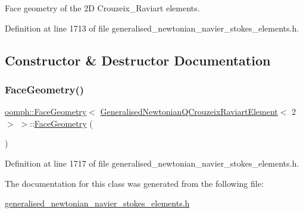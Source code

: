 Face geometry of the 2D Crouzeix\+\_\+\+Raviart elements. 

Definition at line 1713 of file generalised\+\_\+newtonian\+\_\+navier\+\_\+stokes\+\_\+elements.\+h.



\subsection{Constructor \& Destructor Documentation}
\mbox{\label{classoomph_1_1FaceGeometry_3_01GeneralisedNewtonianQCrouzeixRaviartElement_3_012_01_4_01_4_a616ab73e750e2b6c9ee435bfa85840bb}} 
\subsubsection{\texorpdfstring{Face\+Geometry()}{FaceGeometry()}}
{\footnotesize\ttfamily \hyperlink{classoomph_1_1FaceGeometry}{oomph\+::\+Face\+Geometry}$<$ \hyperlink{classoomph_1_1GeneralisedNewtonianQCrouzeixRaviartElement}{Generalised\+Newtonian\+Q\+Crouzeix\+Raviart\+Element}$<$ 2 $>$ $>$\+::\hyperlink{classoomph_1_1FaceGeometry}{Face\+Geometry} (\begin{DoxyParamCaption}{ }\end{DoxyParamCaption})\hspace{0.3cm}{\ttfamily [inline]}}



Definition at line 1717 of file generalised\+\_\+newtonian\+\_\+navier\+\_\+stokes\+\_\+elements.\+h.



The documentation for this class was generated from the following file\+:\begin{DoxyCompactItemize}
\item 
\hyperlink{generalised__newtonian__navier__stokes__elements_8h}{generalised\+\_\+newtonian\+\_\+navier\+\_\+stokes\+\_\+elements.\+h}\end{DoxyCompactItemize}
